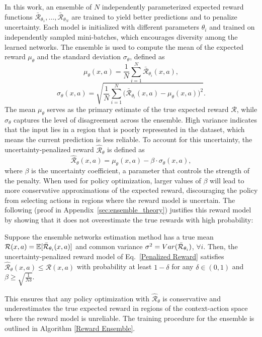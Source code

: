 \documentclass[./dissertation.tex]{subfiles}
\begin{document}
In this work, an ensemble of $N$ independently parameterized expected reward functions $\bar{\mathcal{R}}_{\theta_1}, \dots, \bar{\mathcal{R}}_{\theta_N}$ are trained to yield better predictions and to penalize uncertainty. Each model is initialized with different parameters $\theta_i$ and trained on independently sampled mini-batches, which encourages diversity among the learned networks. The ensemble is used to compute the mean of the expected reward $\mu_\theta$ and the standard deviation $\sigma_\theta$, defined as
\begin{equation}
\mu_\theta(x,a) =
\frac{1}{N} \sum_{i=1}^N
\bar{\mathcal{R}}_{\theta_i}(x,a),
\label{Reward Mean}
\end{equation}
\begin{equation}
\sigma_\theta(x,a) =
\sqrt {\frac{1}{N} \sum_{i=1}^N
\big( \bar{\mathcal{R}}_{\theta_i}(x,a) - \mu_\theta(x,a) \big) ^2}.
\label{Reward Standard Deviation}
\end{equation}
The mean $\mu_\theta$ serves as the primary estimate of the true expected reward $\mathcal{R}$, while $\sigma_\theta$ captures the level of disagreement across the ensemble. High variance indicates that the input lies in a region that is poorly represented in the dataset, which means the current prediction is less reliable. To account for this uncertainty, the uncertainty-penalized reward $\hat{\mathcal{R}}_\theta$ is defined as
\begin{equation}
\hat{\mathcal{R}}_\theta(x,a) =
\mu_\theta(x,a) - \beta \cdot \sigma_\theta(x,a),
\label{Penalized Reward}
\end{equation}
where $\beta$ is the uncertainty coefficient, a parameter that controls the strength of the penalty. When used for policy optimization, larger values of $\beta$ will lead to more conservative approximations of the expected reward, discouraging the policy from selecting actions in regions where the reward model is uncertain.
The following (proof in Appendix~\ref{sec:ensemble_theory}) justifies this reward model by showing that it does not overestimate the true rewards with high probability:
\begin{theorem}
\label{thm:probabilistic_LB_reward_model}
Suppose the ensemble networks estimation method has a true mean ${\cal R}(x,a)=\mathbb{E}[\bar{\cal R}_{\theta_i}(x,a)]$ and common variance $\sigma^2=Var(\bar{\cal R}_{\theta_i})$, $\forall i$. Then, the uncertainty-penalized reward model of Eq.~\ref{Penalized Reward} satisfies $\hat{\mathcal{R}}_\theta(x, a) \leq \mathcal{R}(x, a)$ with probability at least $1 - \delta$ for any $\delta \in (0, 1)$ and $\beta \geq \sqrt{\frac{1}{N\delta}}$.
\end{theorem}
This ensures that any policy optimization with $\hat{\mathcal{R}}_{\theta}$ is conservative and underestimates the true expected reward in regions of the context-action space where the reward model is unreliable. The training procedure for the ensemble is outlined in Algorithm \ref{Reward Ensemble}.
\end{document}
